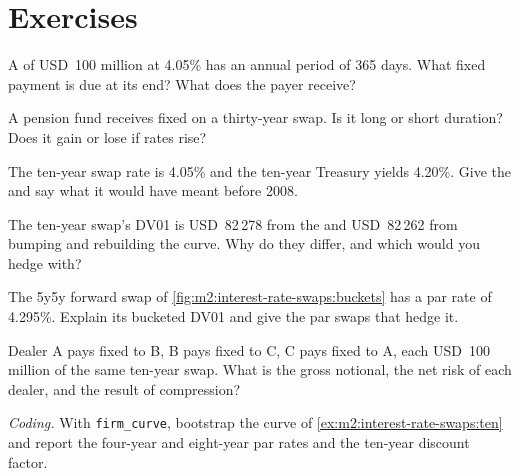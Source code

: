 \section{Exercises}

\begin{exercise}[$\star$]\label{exo:m2:interest-rate-swaps:1}
A  of USD~100 million at 4.05\% has an annual period of 365 days. What
fixed payment is due at its end? What does the payer receive?
\end{exercise}

\begin{exercise}[$\star$]\label{exo:m2:interest-rate-swaps:2}
A pension fund receives fixed on a thirty-year swap. Is it long or short
duration? Does it gain or lose if rates rise?
\end{exercise}

\begin{exercise}[$\star$]\label{exo:m2:interest-rate-swaps:3}
The ten-year swap rate is 4.05\% and the ten-year Treasury yields 4.20\%. Give
the  and say what it would have meant before 2008.
\end{exercise}

\begin{exercise}[$\star\star$]\label{exo:m2:interest-rate-swaps:4}
The ten-year swap's DV01 is USD~82\,278 from the  and USD~82\,262 from bumping
and rebuilding the curve. Why do they differ, and which would you hedge with?
\end{exercise}

\begin{exercise}[$\star\star$]\label{exo:m2:interest-rate-swaps:5}
The 5y5y forward swap of \cref{fig:m2:interest-rate-swaps:buckets} has a par
rate of 4.295\%. Explain its bucketed DV01 and give the par swaps that hedge it.
\end{exercise}

\begin{exercise}[$\star\star$]\label{exo:m2:interest-rate-swaps:6}
Dealer A pays fixed to B, B pays fixed to C, C pays fixed to A, each USD~100
million of the same ten-year swap. What is the gross notional, the net risk of
each dealer, and the result of compression?
\end{exercise}

\begin{exercise}[$\star\star\star$]\label{exo:m2:interest-rate-swaps:7}
\emph{Coding.} With \texttt{firm\_curve}, bootstrap the curve of
\cref{ex:m2:interest-rate-swaps:ten} and report the four-year and eight-year
par rates and the ten-year discount factor.
\end{exercise}

